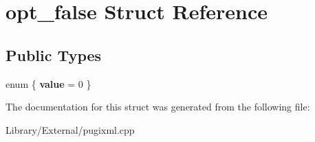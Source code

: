 \hypertarget{structopt__false}{}\section{opt\+\_\+false Struct Reference}
\label{structopt__false}
\subsection*{Public Types}
\begin{DoxyCompactItemize}
\item 
\hypertarget{structopt__false_af733ca9c4e111a001927edf2aad381de}{}enum \{ {\bfseries value} = 0
 \}\label{structopt__false_af733ca9c4e111a001927edf2aad381de}

\end{DoxyCompactItemize}


The documentation for this struct was generated from the following file\+:\begin{DoxyCompactItemize}
\item 
Library/\+External/pugixml.\+cpp\end{DoxyCompactItemize}

